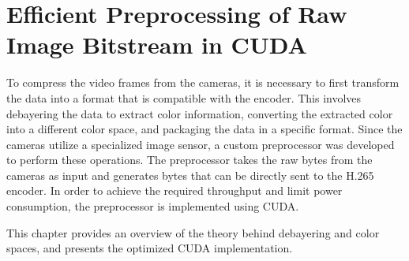 \chapter{Efficient Preprocessing of Raw Image Bitstream in CUDA}
\label{chap:debayer}

To compress the video frames from the cameras, it is necessary to first transform the data into a format that is compatible with the encoder.
This involves debayering the data to extract color information, converting the extracted color into a different color space, and packaging the data in a specific format.
Since the cameras utilize a specialized image sensor, a custom preprocessor was developed to perform these operations.
The preprocessor takes the raw bytes from the cameras as input and generates bytes that can be directly sent to the H.265 encoder.
In order to achieve the required throughput and limit power consumption, the preprocessor is implemented using CUDA.

This chapter provides an overview of the theory behind debayering and color spaces, and presents the optimized CUDA implementation.

